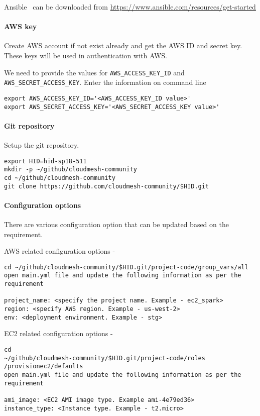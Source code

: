 Ansible~\cite{hid-sp18-511-www-ansible} can be downloaded from
\url{https://www.ansible.com/resources/get-started}

\paragraph{AWS key}

Create AWS account if not exist already and get the AWS ID and secret
key. These keys will be used in authentication with AWS.

We need to provide the values for \verb|AWS_ACCESS_KEY_ID|
and \verb|AWS_SECRET_ACCESS_KEY|. Enter the information on command line

\begin{verbatim}
export AWS_ACCESS_KEY_ID='<AWS_ACCESS_KEY_ID value>'
export AWS_SECRET_ACCESS_KEY='<AWS_SECRET_ACCESS_KEY value>'
\end{verbatim}

\paragraph{Git repository}

Setup the git repository.

\begin{verbatim}
export HID=hid-sp18-511
mkdir -p ~/github/cloudmesh-community
cd ~/github/cloudmesh-community
git clone https://github.com/cloudmesh-community/$HID.git
\end{verbatim}


\paragraph{Configuration options}

There are various configuration option that can be updated based on
the requirement.

AWS related configuration options -

\begin{verbatim}
cd ~/github/cloudmesh-community/$HID.git/project-code/group_vars/all
open main.yml file and update the following information as per the
requirement

project_name: <specify the project name. Example - ec2_spark>
region: <specify AWS region. Example - us-west-2>
env: <deployment environment. Example - stg>
\end{verbatim}

EC2 related configuration options -

\begin{verbatim}
cd
~/github/cloudmesh-community/$HID.git/project-code/roles
/provisionec2/defaults
open main.yml file and update the following information as per the
requirement
 
ami_image: <EC2 AMI image type. Example ami-4e79ed36>
instance_type: <Instance type. Example - t2.micro>
\end{verbatim}


